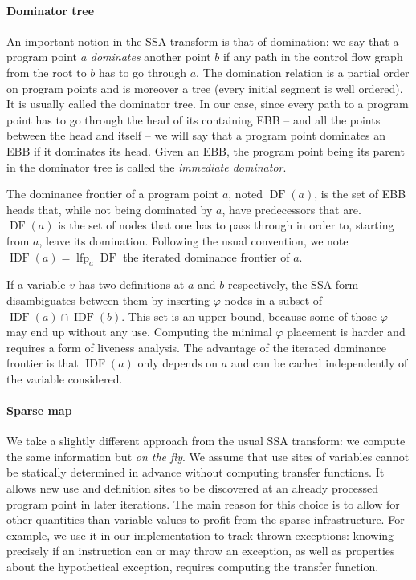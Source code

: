 \documentclass[11pt]{article}
\renewcommand{\phi}{\varphi}
\DeclareMathOperator{\lfp}{lfp}
\DeclareMathOperator{\DF}{DF}
\DeclareMathOperator{\IDF}{IDF}
\begin{document}
\paragraph{Dominator tree} An important notion in the SSA transform is that of domination: we say that a program point $a$ \emph{dominates} another point $b$ if any path in the control flow graph from the root to $b$ has to go through $a$. The domination relation is a partial order on program points and is moreover a tree (every initial segment is well ordered). It is usually called the dominator tree. In our case, since every path to a program point has to go through the head of its containing EBB -- and all the points between the head and itself -- we will say that a program point dominates an EBB if it dominates its head. Given an EBB, the program point being its parent in the dominator tree is called the \emph{immediate dominator}.

The dominance frontier of a program point $a$, noted $\DF(a)$, is the set of EBB heads that, while not being dominated by $a$, have predecessors that are. $\DF(a)$ is the set of nodes that one has to pass through in order to, starting from $a$, leave its domination.
Following the usual convention, we note $\IDF(a) = \lfp_a\DF$ the iterated dominance frontier of $a$.

If a variable $v$ has two definitions at $a$ and $b$ respectively, the SSA form disambiguates between them by inserting $\phi$ nodes in a subset of $\IDF(a)\cap\IDF(b)$.
This set is an upper bound, because some of those $\phi$ may end up without any use. Computing the minimal $\phi$ placement is harder and requires a form of liveness analysis.
The advantage of the iterated dominance frontier is that $\IDF(a)$ only depends on $a$ and can be cached independently of the variable considered.

\paragraph{Sparse map} We take a slightly different approach from the usual SSA transform: we compute the same information but \emph{on the fly}. We assume that use sites of variables cannot be statically determined in advance without computing transfer functions.
It allows new use and definition sites to be discovered at an already processed program point in later iterations.
The main reason for this choice is to allow for other quantities than variable values to profit from the sparse infrastructure.
For example, we use it in our implementation to track thrown exceptions: knowing precisely if an instruction can or may throw an exception, as well as properties about the hypothetical exception, requires computing the transfer function.
\end{document}
